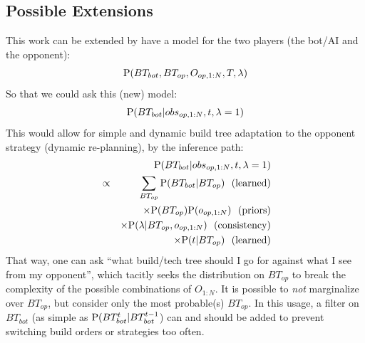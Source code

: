 \subsection{Possible Extensions}
\label{sec:buildtreeimprovements}
This work can be extended by have a model for the two players (the bot/AI and the opponent):
$$\mathrm{P}(BT_{bot}, BT_{op}, O_{op,1:N}, T, \lambda)$$
So that we could ask this (new) model: $$\mathrm{P}(BT_{bot} | obs_{op, 1:N}, t, \lambda=1)$$
This would allow for simple and dynamic build tree adaptation to the opponent strategy (dynamic re-planning), by the inference path:
\begin{eqnarray*}
& & \PP(BT_{bot} | obs_{op, 1:N}, t, \lambda=1)\\
& \propto & \sum_{BT_{op}} \PP(BT_{bot} | BT_{op}) \ \ \mathrm{(learned)} \\
& & \times \PP(BT_{op})\PP(o_{op, 1:N}) \ \ \mathrm{(priors)} \\
& & \times \PP(\lambda | BT_{op}, o_{op, 1:N}) \ \ \mathrm{(consistency)} \\
& & \times \PP(t|BT_{op}) \ \ \mathrm{(learned)}
\end{eqnarray*}
That way, one can ask ``what build/tech tree should I go for against what I see from my opponent'', which tacitly seeks the distribution on $BT_{op}$ to break the complexity of the possible combinations of $O_{1:N}$. It is possible to \textit{not} marginalize over $BT_{op}$, but consider only the most probable(s) $BT_{op}$. In this usage, a filter on $BT_{bot}$ (as simple as $\mathrm{P}(BT_{bot}^t | BT_{bot}^{t-1}$) can and should be added to prevent switching build orders or strategies too often.


